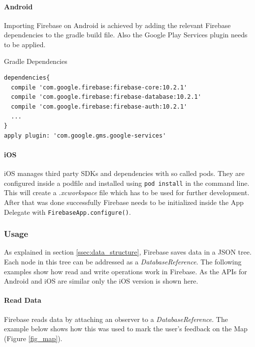 \paragraph{Android}
Importing Firebase on Android is achieved by adding the relevant Firebase dependencies to the gradle build file. Also the Google Play Services plugin needs to be applied.
\begin{listing}[H]
  \caption{Gradle Dependencies}
  \label{mint:grdl_dep}
  \begin{verbatim}
dependencies{
  compile 'com.google.firebase:firebase-core:10.2.1'
  compile 'com.google.firebase:firebase-database:10.2.1'
  compile 'com.google.firebase:firebase-auth:10.2.1'
  ...
}
apply plugin: 'com.google.gms.google-services'
  \end{verbatim}
\end{listing}

\paragraph{iOS}
iOS manages third party SDKs and dependencies with so called pods. They are configured inside a podfile and installed using \texttt{pod install} in the command line. This will create a \textit{.xcworkspace} file which has to be used for further development.\\
After that was done successfully Firebase needs to be initialized inside the App Delegate with \texttt{FirebaseApp.configure()}.

\subsubsection{Usage}\label{ssec:usage}
As explained in section \ref{ssec:data_structure}, Firebase saves data in a JSON tree. Each node in this tree can be addressed as a \textit{DatabaseReference}. The following examples show how read and write operations work in Firebase. As the APIs for Android and iOS are similar only the iOS version is shown here.

\paragraph{Read Data}
Firebase reads data by attaching an observer to a \textit{DatabaseReference}. The example below shows how this was used to mark the user's feedback on the Map (Figure \ref{fig_map}).\\

